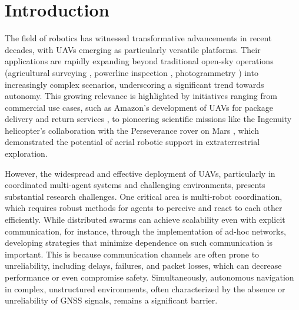 
\chapter{Introduction\label{chap:introduction}}
The field of robotics has witnessed transformative advancements in recent decades, with \ac{UAVs} emerging as particularly versatile platforms. 
Their applications are rapidly expanding beyond traditional open-sky operations (agricultural surveying \cite{agricultural_survey}, powerline inspection \cite{powerline_inspection}, photogrammetry \cite{photogrammetry}) into increasingly complex scenarios, underscoring a significant trend towards autonomy. 
This growing relevance is highlighted by initiatives ranging from commercial use cases, such as Amazon's development of \ac{UAV}s for package delivery and return services \cite{InsiderIntelligence_DroneDelivery}, to pioneering scientific missions like 
  the Ingenuity helicopter's collaboration with the Perseverance rover on Mars \cite{NASA_Ingenuity}, which demonstrated the potential of aerial robotic support in extraterrestrial exploration.

However, the widespread and effective deployment of \ac{UAV}s, particularly in coordinated multi-agent systems and challenging environments, presents substantial research challenges. 
One critical area is multi-robot coordination, which requires robust methods for agents to perceive and react to each other efficiently. 
While distributed swarms can achieve scalability even with explicit communication, for instance, through the implementation of ad-hoc networks, developing strategies that minimize dependence on such communication is important. 
This is because communication channels are often prone to unreliability, including delays, failures, and packet losses, which can decrease performance or even compromise safety.
Simultaneously, autonomous navigation in complex, unstructured environments, often characterized by the absence or unreliability of \ac{GNSS} signals, remains a significant barrier.


